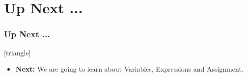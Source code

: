 \documentclass[fleqn]{beamer} %
\newcommand{\sectiontitleIV}{Up Next ...}
\begin{document}
\section{\sectiontitleIV}	
	\begin{frame}[label=sectionIV] \small
		\frametitle{\sectiontitleIV}    
	
 			[triangle]
            \begin{itemize}

                \item {\bf Next:} We are going to learn about Variables, Expressions and Assignment. \vspc

            \end{itemize}
	\end{frame}
\end{document}
